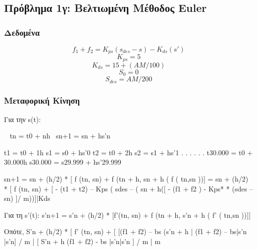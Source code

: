 \documentclass[a4paper]{article}
\begin{document}



        \subsection{Πρόβλημα 1γ: Βελτιωμένη Μέθοδος Euler}

        \subsubsection{Δεδομένα}

        \[f_1 + f_2 = K_{ps}(s_{des} - s) - K_{ds}(s')\]
        \[K_{ps} = 5\]
        \[K_{ds} = 15 + (AM/ 100)\]
        \[S_0 =0\]
        \[S_{des} = AM / 200\]

        \subsubsection{Μεταφορική Κίνηση}
            Για την s(t):

        ~ tn = t0 + nh					~sn+1 = sn  + hs’n

        t1 = t0  + 1h					   s1    = s0  + hs’­­­0
        t2 = t0  + 2h					   s2    = s1  + hs’1
            .						     .
            .						     .
            .						     .
        t30.000 = t0 + 30.000h			     s30.000 = s29.999 + hs’29.999




        sn+1 = sn + (h/2) * [ f (tn, sn) + f (tn + h, sn + h (  f (  tn,sn ))]
                = sn  + (h/2) * [ f (tn, sn) + [ - (t1 + t2) – Kps ( sdes – ( sn + h([ - (f1 + f2 ) - Kps*              
                                                                                                * (sdes – sn) ]/ m))]|Kds

        Για τη s’(t):
        s’n+1 = s’n + (h/2) * [f’(tn, sn) + f (tn + h, s’n + h (  f’ (  tn,sn ))]]

        Οπότε,
        S’n  + (h/2) * [  f’  (tn, sn) + [ [(f1 + f2) – bs (s’n + h  |  (f1 + f2) – bs|s’n |s’n]  /  m  |  [ S’n + h (f1 + f2)  - bs |s’n|s’n ] / m  |  m 
\end{document}
